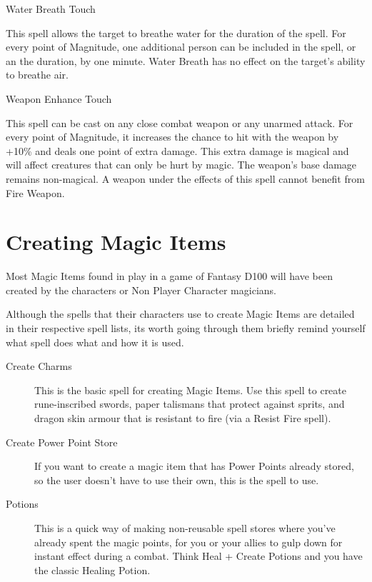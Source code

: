 \begin{rpg-spell}
{Water Breath}
{Touch}

This spell allows the target to breathe water for the duration of the spell. For every point of Magnitude, one additional person can be included in the spell, or an the duration, by one minute. Water Breath has no effect on the target’s ability to breathe air.
\end{rpg-spell}


\begin{rpg-spell}
{Weapon Enhance}
{Touch}

This spell can be cast on any close combat weapon or any unarmed attack. For every point of Magnitude, it increases the chance to hit with the weapon by +10\% and deals one point of extra damage. This extra damage is magical and will affect creatures that can only be hurt by magic. The weapon’s base damage remains non-magical. A weapon under the effects of this spell cannot benefit from Fire Weapon.
\end{rpg-spell}


\section{Creating Magic Items}

Most Magic Items found in play in a game of Fantasy D100 will have been created by the characters or Non Player Character magicians.

Although the spells that their characters use to create Magic Items are detailed in their respective spell lists, its worth going through them briefly remind yourself what spell does what and how it is used.

\begin{description}
\item [Create Charms] This is the basic spell for creating Magic Items. Use this spell to create rune-inscribed swords, paper talismans that protect against sprits, and dragon skin armour that is resistant to fire (via a Resist Fire spell).
\item [Create Power Point Store] If you want to create a magic item that has Power Points already stored, so the user doesn’t have to use their own, this is the spell to use.
\item [Potions] This is a quick way of making non-reusable spell stores where you’ve already spent the magic points, for you or your allies to gulp down for instant effect during a combat. Think Heal + Create Potions and you have the classic Healing Potion.
\end{description}

